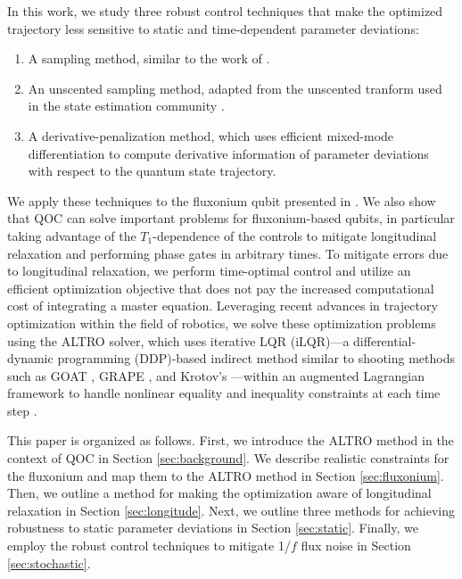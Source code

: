 In this work, we study three robust control techniques that
make the optimized trajectory less sensitive
to static and time-dependent parameter deviations:
\begin{enumerate}
\item A sampling method, similar to the work of \cite{carvalho2020error, reinhold2019controlling,
  rembold2020introduction}.
  \item An unscented sampling method, adapted from the unscented tranform used in the 
    state estimation community \cite{howell2020direct, julier2004unscented,
      lee2013sigma, manchester2016derivative}.
  \item A derivative-penalization method, which uses efficient mixed-mode differentiation
  to compute derivative information of parameter deviations with respect to the 
  quantum state trajectory.
\end{enumerate}
We apply these techniques to the fluxonium qubit presented in \cite{zhang2020universal}.
We also show that QOC can solve important problems for fluxonium-based qubits,
in particular taking advantage of the $T_{1}$-dependence of the controls
to mitigate longitudinal relaxation and
performing phase gates in arbitrary times.
To mitigate errors due to longitudinal
relaxation, we perform time-optimal control and
utilize an efficient optimization objective that does
not pay the increased computational cost of integrating a master equation.
Leveraging recent advances in trajectory optimization within the field of robotics, we
solve these optimization problems using the ALTRO solver, which uses iterative LQR 
(iLQR)---a differential-dynamic programming (DDP)-based indirect method similar to shooting
methods such as GOAT \cite{machnes2015gradient}, GRAPE
\cite{khaneja2005optimal, leung2017speedup}, and Krotov's \cite{goerz2019krotov}---within 
an augmented Lagrangian framework to handle nonlinear equality and inequality constraints at 
each time step \cite{howell2019altro}. 

This paper is organized as follows.
First, we introduce the ALTRO method in the context of QOC
in Section \ref{sec:background}.
We describe realistic constraints for the fluxonium and
map them to the ALTRO method in Section \ref{sec:fluxonium}. Then, we
outline a method for making the optimization aware of longitudinal
relaxation in Section \ref{sec:longitude}. Next, we outline three methods for achieving
robustness to static parameter deviations in Section \ref{sec:static}. Finally,
we employ the robust control techniques to mitigate 1/$f$ flux noise
in Section \ref{sec:stochastic}.
